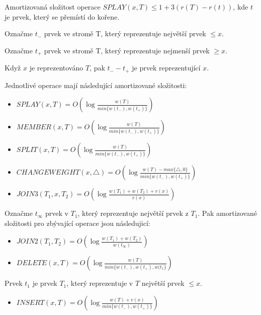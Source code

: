 \begin{defn}
Amortizovaná složitost operace $SPLAY(x,T) \leq 1 + 3(r(T)-r(t))$, kde $t$
je prvek, který se přemístí do kořene.
\end{defn}

\par
Označme $t_{-}$ prvek ve stromě T, který reprezentuje největší prvek 
$\leq x$.
\par
Označme $t_{+}$ prvek ve stromě T, který reprezentuje nejmenší prvek 
$\geq x$.
\par
Když $x$ je reprezentováno $T$, pak $t_{-} - t_{+}$ je prvek reprezentující
$x$.
\par
Jednotlivé operace mají následující amortizované složitosti:

\begin{itemize}
\item $SPLAY(x,T) = O(\log\frac{w(T)}{min\{w(t_{-}),w(t_{+})\}})$ \\
\item $MEMBER(x,T) = O(\log\frac{w(T)}{min\{w(t_{-}),w(t_{+})\}})$ \\
\item $SPLIT(x,T) = O(\log\frac{w(T)}{min\{w(t_{-}),w(t_{+})\}})$ \\
\item $CHANGEWEIGHT(x, \triangle) = O(\log\frac{
w(T) - max\{\triangle,0\}}{min\{w(t_{-}),w(t_{+})\}
})$ \\
\item $JOIN3(T_1, x, T_2) = O(\log\frac{w(T_1)+w(T_2)+v(x)}{v(x)})$
\end{itemize}

Označme $t_{\infty}$ prvek v $T_1$, který reprezentuje největší prvek z
$T_1$. Pak amortizované složitosti pro zbývající operace jsou
následujicí:
\par

\begin{itemize}
\item $JOIN2(T_1,T_2) = O(\log\frac{w(T_1) + w(T_2)}{w(t_{\infty})})$ \\
\item $DELETE(x,T) = O(\log\frac{w(T)}{min\{w(t_{-}),w(t_{+}),w(t_{1}\}})$ \\
\end{itemize}

Prvek $t_1$ je prvek $T_1$, který reprezentuje v $T$ největší prvek $\leq x$.

\begin{itemize}
\item $INSERT(x,T) = O(\log\frac{w(T) + v(x)}{min\{w(t_{-}),w(t_{+})\}})$
\end{itemize}

